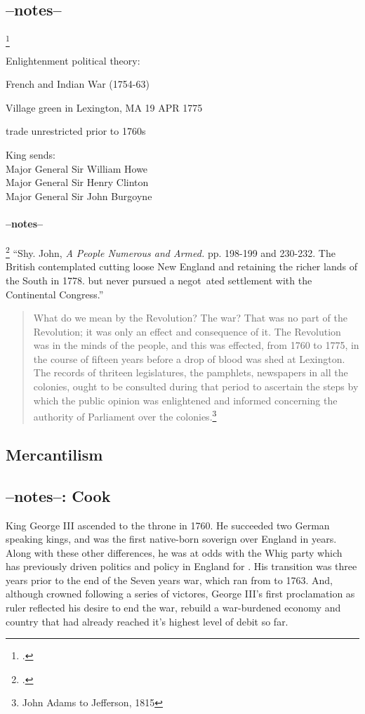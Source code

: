 \subsection{--notes--}\footcite[p. 2]{moncure_cowpens_1996}

Enlightenment political theory:

French and Indian War (1754-63)

Village green in Lexington, MA 19 APR 1775

trade unrestricted prior to 1760s

King sends:\\
Major General Sir William Howe\\
Major General Sir Henry Clinton\\
Major General Sir John Burgoyne

\paragraph{--notes--}\footcite[]{}
``Shy. John, \emph{A People Numerous and Armed.} pp. 198-199 and 230-232. The British contemplated cutting loose New England and retaining the richer lands of the South in 1778. but never pursued a negot~ated settlement with the Continental Congress.''


\begin{quotation}
  What do we mean by the Revolution? The war? That was no part of the Revolution;
  it was only an effect and consequence of it. The Revolution was in the minds of
  the people, and this was effected, from 1760 to 1775, in the course of
  fifteen years before a drop of blood was shed at Lexington. The records of
  thriteen legislatures, the pamphlets, newspapers in all the colonies, ought
  to be consulted during that period to ascertain the steps by which the public
  opinion was enlightened and informed concerning the authority of Parliament
  over the colonies.\footnote{John Adams to Jefferson, 1815}
\end{quotation}

\subsection{Mercantilism}

\subsection{--notes--: Cook}

King George III ascended to the throne in 1760. He succeeded two German
speaking kings, and was the first native-born soverign over England in
 years. Along with these other differences, he was at odds with the
Whig party which has previously driven politics and policy in England for
. His transition was three years prior to the end of the Seven
years war, which ran from  to 1763. And, although crowned following a
series of victores, George III's first proclamation as ruler reflected his
desire to end the war, rebuild a war-burdened economy and country that had
already reached it's highest level of debit so far.


